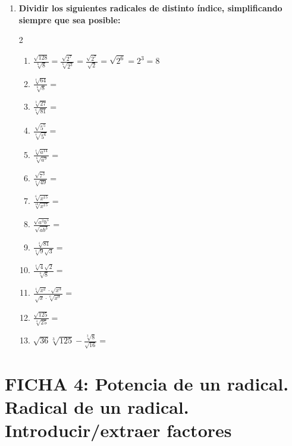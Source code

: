 \documentclass[a4paper,12pt]{article}
\begin{document}
\begin{enumerate}
    \item \textbf{Dividir los siguientes radicales de distinto índice, simplificando siempre que sea posible:}
    \begin{multicols}{2}
    \begin{enumerate}[label=\alph*)]
        \item $\frac{\sqrt{128}}{\sqrt[6]{8}} = \frac{\sqrt{2^7}}{\sqrt[6]{2^3}} = \frac{\sqrt{2^7}}{\sqrt{2}} = \sqrt{2^6} = 2^3 = 8$
        \item $\frac{\sqrt[4]{64}}{\sqrt[6]{8}} =$
        \item $\frac{\sqrt[3]{27}}{\sqrt[6]{81}} =$
        \item $\frac{\sqrt{5^5}}{\sqrt[4]{5^6}} =$
        \item $\frac{\sqrt[4]{a^{14}}}{\sqrt[6]{a^9}} =$
        \item $\frac{\sqrt{7^3}}{\sqrt[4]{49}} =$
        \item $\frac{\sqrt[6]{x^{15}}}{\sqrt[10]{x^{15}}} =$
        \item $\frac{\sqrt{a^3 b^5}}{\sqrt{a b^3}} =$
        \item $\frac{\sqrt[4]{81}}{\sqrt[4]{9}\sqrt{3}} =$
        \item $\frac{\sqrt[4]{4}\sqrt{2}}{\sqrt[6]{8}} =$
        \item $\frac{\sqrt[4]{x^2}\cdot\sqrt{x^3}}{\sqrt{x}\cdot\sqrt[6]{x^9}} =$
        \item $\frac{\sqrt{125}}{\sqrt[4]{25}} =$
        \item $\sqrt{36}\sqrt[3]{125} - \frac{\sqrt[3]{8}}{\sqrt{16}} =$
    \end{enumerate}
    \end{multicols}
\end{enumerate}

\newpage

\section*{FICHA 4: Potencia de un radical. Radical de un radical. Introducir/extraer factores}
\end{document}
